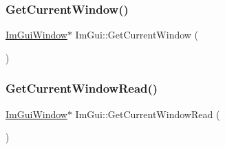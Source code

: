 \mbox{\label{namespace_im_gui_a7ceba68eca2b09fb6bf1ad88037e6203}} 
\subsubsection{\texorpdfstring{Get\+Current\+Window()}{GetCurrentWindow()}}
{\footnotesize\ttfamily \mbox{\hyperlink{struct_im_gui_window}{Im\+Gui\+Window}}$\ast$ Im\+Gui\+::\+Get\+Current\+Window (\begin{DoxyParamCaption}{ }\end{DoxyParamCaption})\hspace{0.3cm}{\ttfamily [inline]}}

\mbox{\label{namespace_im_gui_a408f9ddac92f8629a7e273ced5f8c3aa}} 
\subsubsection{\texorpdfstring{Get\+Current\+Window\+Read()}{GetCurrentWindowRead()}}
{\footnotesize\ttfamily \mbox{\hyperlink{struct_im_gui_window}{Im\+Gui\+Window}}$\ast$ Im\+Gui\+::\+Get\+Current\+Window\+Read (\begin{DoxyParamCaption}{ }\end{DoxyParamCaption})\hspace{0.3cm}{\ttfamily [inline]}}


